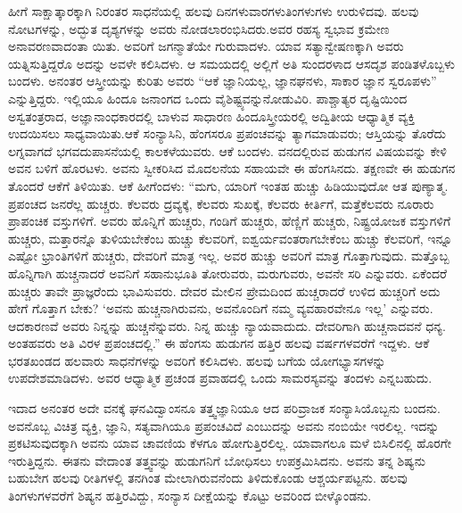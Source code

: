 ಹೀಗೆ ಸಾಕ್ಷಾತ್ಕಾರಕ್ಕಾಗಿ ನಿರಂತರ ಸಾಧನೆಯಲ್ಲಿ ಹಲವು ದಿನಗಳುವಾರಗಳುತಿಂಗಳುಗಳು ಉರುಳಿದವು. ಹಲವು ನೋಟಗಳನ್ನು, ಅದ್ಭುತ ದೃಶ್ಯಗಳನ್ನು ಅವರು ನೋಡಲಾರಂಭಿಸಿದರು.ಅವರ ರಹಸ್ಯ ಸ್ವಭಾವ ಕ್ರಮೇಣ ಅನಾವರಣವಾದಂತಾ ಯಿತು. ಅವರಿಗೆ ಜಗನ್ಮಾತೆಯೇ ಗುರುವಾದಳು. ಯಾವ ಸತ್ಯಾನ್ವೇಷಣಕ್ಕಾಗಿ ಅವರು ಯತ್ನಿಸುತ್ತಿದ್ದರೊ ಅದನ್ನು ಅವಳೇ ಕಲಿಸಿದಳು. ಆ ಸಮಯದಲ್ಲಿ ಅಲ್ಲಿಗೆ ಅತಿ ಸುಂದರಳಾದ ಆಸದೃಶ ಪಂಡಿತಳೊಬ್ಬಳು ಬಂದಳು. ಅನಂತರ ಆಸ್ತ್ರೀಯನ್ನು ಕುರಿತು ಅವರು “ಆಕೆ ಜ್ಞಾನಿಯಲ್ಲ, ಜ್ಞಾನಘನಳು, ಸಾಕಾರ ಜ್ಞಾನ ಸ್ವರೂಪಳು” ಎನ್ನುತ್ತಿದ್ದರು. ಇಲ್ಲಿಯೂ ಹಿಂದೂ ಜನಾಂಗದ ಒಂದು ವೈಶಿಷ್ಟ್ಯವನ್ನುನೋಡುವಿರಿ. ಪಾಶ್ಚಾತ್ಯರ ದೃಷ್ಟಿಯಿಂದ ಅಸ್ವತಂತ್ರರಾದ, ಅಜ್ಞಾನಾಂಧಕಾರದಲ್ಲಿ ಬಾಳುವ ಸಾಧಾರಣ ಹಿಂದೂಸ್ತ್ರೀಯರಲ್ಲಿ ಅದ್ವಿತೀಯ ಆಧ್ಯಾತ್ಮಿಕ ವ್ಯಕ್ತಿ ಉದಯಿಸಲು ಸಾಧ್ಯವಾಯಿತು.ಆಕೆ ಸಂನ್ಯಾಸಿನಿ, ಹೆಂಗಸರೂ ಪ್ರಪಂಚವನ್ನು ತ್ಯಾಗಮಾಡುವರು; ಆಸ್ತಿಯನ್ನು ತೊರೆದು ಲಗ್ನವಾಗದೆ ಭಗವದುಪಾಸನೆಯಲ್ಲಿ ಕಾಲಕಳೆಯುವರು. ಆಕೆ ಬಂದಳು. ವನದಲ್ಲಿರುವ ಹುಡುಗನ ವಿಷಯವನ್ನು ಕೇಳಿ ಅವನ ಬಳಿಗೆ ಹೊರಟಳು. ಅವನು ಸ್ವೀಕರಿಸಿದ ಮೊದಲನೆಯ ಸಹಾಯವೇ ಈ ಹೆಂಗಸಿನದು. ತಕ್ಷಣವೇ ಈ ಹುಡುಗನ ತೊಂದರೆ ಆಕೆಗೆ ತಿಳಿಯಿತು. ಆಕೆ ಹೀಗೆಂದಳು: “ಮಗು, ಯಾರಿಗೆ ಇಂತಹ ಹುಚ್ಚು ಹಿಡಿಯುವುದೋ ಆತ ಪುಣ್ಯಾತ್ಮ. ಪ್ರಪಂಚದ ಜನರೆಲ್ಲ ಹುಚ್ಚರು. ಕೆಲವರು ದ್ರವ್ಯಕ್ಕೆ, ಕೆಲವರು ಸುಖಕ್ಕೆ, ಕೆಲವರು ಕೀರ್ತಿಗೆ, ಮತ್ತೆಕೆಲವರು ನೂರಾರು ಪ್ರಾಪಂಚಿಕ ವಸ್ತುಗಳಿಗೆ. ಅವರು ಹೊನ್ನಿಗೆ ಹುಚ್ಚರು, ಗಂಡಿಗೆ ಹುಚ್ಚರು, ಹೆಣ್ಣಿಗೆ ಹುಚ್ಚರು, ನಿಷ್ಟ್ರಯೋಜಕ ವಸ್ತುಗಳಿಗೆ ಹುಚ್ಚರು, ಮತ್ತಾರನ್ನೊ ತುಳಿಯಬೇಕೆಂಬ ಹುಚ್ಚು ಕೆಲವರಿಗೆ, ಐಶ್ವರ್ಯವಂತರಾಗಬೇಕೆಂಬ ಹುಚ್ಚು ಕೆಲವರಿಗೆ, ಇನ್ನೂ ಎಷ್ಟೋ ಭ್ರಾಂತಿಗಳಿಗೆ ಹುಚ್ಚರು, ದೇವರಿಗೆ ಮಾತ್ರ ಇಲ್ಲ. ಅವರ ಹುಚ್ಚು ಅವರಿಗೆ ಮಾತ್ರ ಗೊತ್ತಾಗುವುದು. ಮತ್ತೊಬ್ಬ ಹೊನ್ನಿಗಾಗಿ ಹುಚ್ಚನಾದರೆ ಅವನಿಗೆ ಸಹಾನುಭೂತಿ ತೋರುವರು, ಮರುಗುವರು, ಅವನೇ ಸರಿ ಎನ್ನುವರು. ಏಕೆಂದರೆ ಹುಚ್ಚರು ತಾವೇ ಪ್ರಾಜ್ಞರೆಂದು ಭಾವಿಸುವರು. ದೇವರ ಮೇಲಿನ ಪ್ರೇಮದಿಂದ ಹುಚ್ಚರಾದರೆ ಉಳಿದ ಹುಚ್ಚರಿಗೆ ಅದು ಹೇಗೆ ಗೊತ್ತಾಗ ಬೇಕು? ‘ಅವನು ಹುಚ್ಚನಾಗಿರುವನು, ಅವನೊಂದಿಗೆ ನಮ್ಮ ವ್ಯವಹಾರವೇನೂ ಇಲ್ಲ’ ಎನ್ನುವರು. ಆದಕಾರಣವೆ ಅವರು ನಿನ್ನನ್ನು ಹುಚ್ಚನೆನ್ನುವರು. ನಿನ್ನ ಹುಚ್ಚು ನ್ಯಾಯವಾದುದು. ದೇವರಿಗಾಗಿ ಹುಚ್ಚನಾದವನೆ ಧನ್ಯ. ಅಂತಹವರು ಅತಿ ವಿರಳ ಪ್ರಪಂಚದಲ್ಲಿ.” ಈ ಹೆಂಗಸು ಹುಡುಗನ ಹತ್ತಿರ ಹಲವು ವರ್ಷಗಳವರೆಗೆ ಇದ್ದಳು. ಆಕೆ ಭರತಖಂಡದ ಹಲವಾರು ಸಾಧನೆಗಳನ್ನು ಅವರಿಗೆ ಕಲಿಸಿದಳು. ಹಲವು ಬಗೆಯ ಯೋಗಭ್ಯಾಸಗಳನ್ನು ಉಪದೇಶಮಾಡಿದಳು. ಅವರ ಆಧ್ಯಾತ್ಮಿಕ ಪ್ರಚಂಡ ಪ್ರವಾಹದಲ್ಲಿ ಒಂದು ಸಾಮರಸ್ಯವನ್ನು ತಂದಳು ಎನ್ನಬಹುದು.

ಇದಾದ ಅನಂತರ ಅದೇ ವನಕ್ಕೆ ಘನವಿದ್ವಾಂಸನೂ ತತ್ತ್ವಜ್ಞಾನಿಯೂ ಆದ ಪರಿವ್ರಾಜಕ ಸಂನ್ಯಾಸಿಯೊಬ್ಬನು ಬಂದನು. ಅವನೊಬ್ಬ ವಿಚಿತ್ರ ವ್ಯಕ್ತಿ, ಜ್ಞಾನಿ, ಸತ್ಯವಾಗಿಯೂ ಪ್ರಪಂಚವಿದೆ ಎಂಬುದನ್ನು ಅವನು ನಂಬಿಯೇ ಇರಲಿಲ್ಲ. ಇದನ್ನು ಪ್ರಕಟಿಸುವುದಕ್ಕಾಗಿ ಅವನು ಯಾವ ಚಾವಣಿಯ ಕೆಳಗೂ ಹೋಗುತ್ತಿರಲಿಲ್ಲ. ಯಾವಾಗಲೂ ಮಳೆ ಬಿಸಿಲಿನಲ್ಲಿ ಹೊರಗೇ ಇರುತ್ತಿದ್ದನು. ಈತನು ವೇದಾಂತ ತತ್ತ್ವವನ್ನು ಹುಡುಗನಿಗೆ ಬೋಧಿಸಲು ಉಪಕ್ರಮಿಸಿದನು. ಅವನು ತನ್ನ ಶಿಷ್ಯನು ಬಹುಬೇಗ ಹಲವು ರೀತಿಗಳಲ್ಲಿ ತನಗಿಂತ ಮೇಲಾಗಿರುವನೆಂದು ತಿಳಿದುಕೊಂಡು ಆಶ್ಚರ್ಯಪಟ್ಟನು. ಹಲವು ತಿಂಗಳುಗಳವರೆಗೆ ಶಿಷ್ಯನ ಹತ್ತಿರವಿದ್ದು, ಸಂನ್ಯಾಸ ದೀಕ್ಷೆಯನ್ನು ಕೊಟ್ಟು ಅವರಿಂದ ಬೀಳ್ಕೊಂಡನು.

